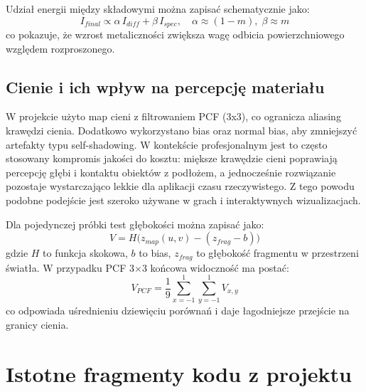 \documentclass[12pt,a4paper]{article}
\begin{document}
Udział energii między składowymi można zapisać schematycznie jako:
\[
I_{final} \propto \alpha\,I_{diff} + \beta\,I_{spec}, \quad \alpha \approx (1-m),\; \beta \approx m
\]
co pokazuje, że wzrost metaliczności zwiększa wagę odbicia powierzchniowego względem rozproszonego.

\subsection{Cienie i ich wpływ na percepcję materiału}
W projekcie użyto map cieni z filtrowaniem PCF (3x3), co ogranicza aliasing krawędzi cienia. Dodatkowo wykorzystano bias oraz normal bias, aby zmniejszyć artefakty typu self-shadowing. W kontekście profesjonalnym jest to często stosowany kompromis jakości do kosztu: miększe krawędzie cieni poprawiają percepcję głębi i kontaktu obiektów z podłożem, a jednocześnie rozwiązanie pozostaje wystarczająco lekkie dla aplikacji czasu rzeczywistego. Z tego powodu podobne podejście jest szeroko używane w grach i interaktywnych wizualizacjach.

Dla pojedynczej próbki test głębokości można zapisać jako:
\[
V = H\big(z_{map}(u,v) - (z_{frag}-b)\big)
\]
gdzie $H$ to funkcja skokowa, $b$ to bias, $z_{frag}$ to głębokość fragmentu w przestrzeni światła. W przypadku PCF 3\(\times\)3 końcowa widoczność ma postać:
\[
V_{PCF} = \frac{1}{9}\sum_{x=-1}^{1}\sum_{y=-1}^{1} V_{x,y}
\]
co odpowiada uśrednieniu dziewięciu porównań i daje łagodniejsze przejście na granicy cienia.

\section{Istotne fragmenty kodu z projektu}
\end{document}
